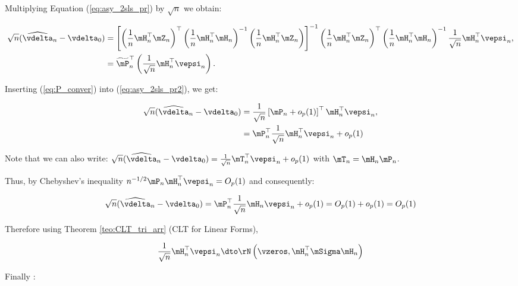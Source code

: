 \documentclass[english,12pt]{book}\usepackage[]{graphicx}\usepackage[]{xcolor}
\begin{document}
Multiplying Equation (\ref{eq:asy_2sls_pr}) by $\sqrt{n}$ we obtain:

\begin{equation}\label{eq:asy_2sls_pr2}
\begin{aligned}
\sqrt{n}(\widehat{\vdelta}_{n} - \vdelta_0) & = \left[\left(\frac{1}{n}\mH^\top_n\mZ_n\right)^\top\left(\frac{1}{n}\mH^\top_n\mH_n\right)^{-1}\left(\frac{1}{n}\mH^\top_n\mZ_n\right)\right]^{-1}\left(\frac{1}{n}\mH^\top_n\mZ_n\right)^\top\left(\frac{1}{n}\mH^\top_n\mH_n\right)^{-1}\frac{1}{\sqrt{n}}\mH^\top_n\vepsi_n, \\
             & = \widetilde{\mP}^\top_n\left(\frac{1}{\sqrt{n}}\mH^\top_n\vepsi_n\right).
\end{aligned}
\end{equation}

Inserting (\ref{eq:P_conver}) into (\ref{eq:asy_2sls_pr2}), we get:

\begin{equation*}
\begin{aligned}
\sqrt{n}(\widehat{\vdelta}_{n} - \vdelta_0) & = \frac{1}{\sqrt{n}}\left[\mP_n + o_p(1)\right]^\top\mH^\top_n\vepsi_n, \\
                                            & =\mP^\top_n\frac{1}{\sqrt{n}}\mH^\top_n\vepsi_n + o_p(1)
\end{aligned}
\end{equation*}

Note that we can also write: $\sqrt{n}(\widehat{\vdelta}_{n} - \vdelta_0) = \frac{1}{\sqrt{n}}\mT_n^\top\vepsi_n + o_p(1)$ with $\mT_n = \mH_n\mP_n$. 



Thus, by Chebyshev's inequality  $n^{-1/2}\mP_n\mH^\top_n\vepsi_n = O_p(1)$ and  consequently:

\begin{equation*}
\sqrt{n}(\widehat{\vdelta}_{n} - \vdelta_0) = \mP^\top_n\frac{1}{\sqrt{n}}\mH_n\vepsi_n + o_p(1) = O_p(1) + o_p(1) = O_p(1)
\end{equation*}

Therefore using Theorem \ref{teo:CLT_tri_arr} (CLT for Linear Forms),

\begin{equation*}
\frac{1}{\sqrt{n}}\mH_n^\top\vepsi_n \dto \rN\left(\vzeros,\mH_n^\top \mSigma \mH_n\right)
\end{equation*}

Finally :
\end{document}
